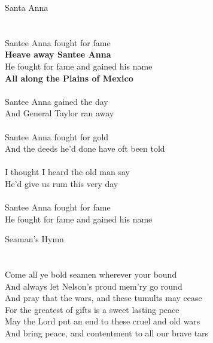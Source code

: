 \documentclass[letterpaper,9pt]{article}
\begin{document}
\newpage
{}
\huge
Santa Anna\\
\\
\LARGE
\\Santee Anna fought for fame
\\\textbf{Heave away Santee Anna}
\\He fought for fame and gained his name
\\\textbf{All along the Plains of Mexico}
\\
\\Santee Anna gained the day
\\And General Taylor ran away
\\
\\Santee Anna fought for gold
\\And the deeds he'd done have oft been told
\\
\\I thought I heard the old man say
\\He'd give us rum this very day
\\
\\Santee Anna fought for fame
\\He fought for fame and gained his name

\newpage
{}
\huge
Seaman's Hymn\\
\\
\\Come all ye bold seamen wherever your bound
\\And always let Nelson's proud mem'ry go round
\\And pray that the wars, and these tumults may cease
\\For the greatest of gifts is a sweet lasting peace
\\May the Lord put an end to these cruel and old wars
\\And bring peace, and contentment to all our brave tars
\end{document}
